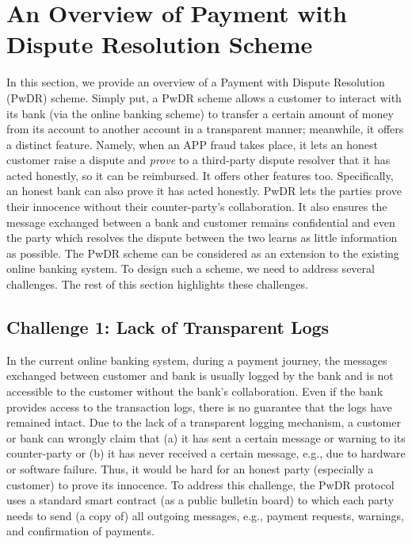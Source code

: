 

\section{An Overview of Payment with Dispute Resolution Scheme}

In this section, we provide an overview of a Payment with Dispute Resolution (PwDR) scheme. Simply put, a PwDR scheme  allows a customer to interact with its bank (via the online banking scheme) to transfer a certain amount of money from its account to another account in a transparent manner; meanwhile, it  offers a distinct  feature. Namely, when an APP fraud takes place, it lets an honest customer raise a dispute and \emph{prove} to a third-party dispute resolver that it has acted honestly, so it can be reimbursed. It offers other features too. Specifically,  an honest bank can also prove it has acted honestly. PwDR lets the parties prove their innocence  without their counter-party's collaboration. It also ensures the message exchanged between a bank and customer remains confidential and even the party which resolves the dispute between the two learns as little information as possible.  The PwDR scheme can be considered as an extension to the existing   online banking system. To design such a scheme, we need to address  several challenges. The rest of this section  highlights these challenges. 




\subsection{Challenge 1: Lack of Transparent Logs} 
In the current online  banking system, during a payment journey, the messages exchanged between customer and bank is usually logged by the bank and is not accessible to the customer without the bank's collaboration. Even if the bank provides access to the transaction logs, there is no guarantee that the logs have remained intact. Due to the lack of a transparent logging mechanism, a customer or bank can wrongly claim that (a) it has sent a certain message or warning to its counter-party or (b) it has never  received a certain message, e.g., due to hardware or software failure.  Thus, it would be hard for an honest party (especially a customer) to prove its innocence. To address this challenge, the PwDR protocol uses a standard smart contract (as a public bulletin board) to which  each party needs to send (a copy of) all outgoing messages, e.g., payment requests, warnings, and  confirmation of payments. 




